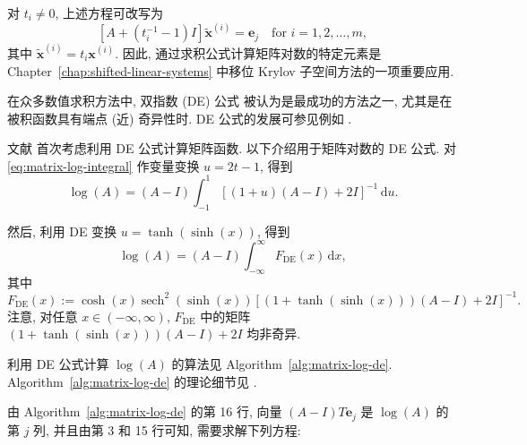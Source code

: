 {对 $t_i\ne0$, 上述方程可改写为}
\begin{equation}\label{eq:matrix-log-shifted-systems}[A+(t_i^{-1}-1)I]\widetilde{\boldsymbol{x}}^{(i)}=\boldsymbol{e}_j\quad\text{for }i=1,2,\ldots,m,\end{equation}
{其中 $\widetilde{\boldsymbol{x}}^{(i)}=t_i\boldsymbol{x}^{(i)}$. 因此, 通过求积公式计算矩阵对数的特定元素是 Chapter~\ref{chap:shifted-linear-systems} 中移位 Krylov 子空间方法的一项重要应用.}

{在众多数值求积方法中, 双指数 (DE) 公式  被认为是最成功的方法之一, 尤其是在被积函数具有端点 (近) 奇异性时. DE 公式的发展可参见例如 .}

{文献  首次考虑利用 DE 公式计算矩阵函数. 以下介绍用于矩阵对数的 DE 公式. 对 \eqref{eq:matrix-log-integral} 作变量变换 $u=2t-1$, 得到}
\begin{equation}\label{eq:matrix-log-symmetric-integral}\log(A)=(A-I)\int_{-1}^1[(1+u)(A-I)+2I]^{-1}\,\mathrm{d}u.\end{equation}

{然后, 利用 DE 变换 $u=\tanh(\sinh(x))$, 得到}
\begin{equation}\label{eq:matrix-log-de-integral}\log(A)=(A-I)\int_{-\infty}^{\infty}F_{\mathrm{DE}}(x)\,\mathrm{d}x,\end{equation}
{其中}
\begin{equation}\label{eq:matrix-log-de-integrand}F_{\mathrm{DE}}(x):=\cosh(x)\operatorname{sech}^2(\sinh(x))[(1+\tanh(\sinh(x)))(A-I)+2I]^{-1}.\end{equation}
{注意, 对任意 $x\in(-\infty,\infty)$, $F_{\mathrm{DE}}$ 中的矩阵 $(1+\tanh(\sinh(x)))(A-I)+2I$ 均非奇异.}

{利用 DE 公式计算 $\log(A)$ 的算法见 Algorithm~\ref{alg:matrix-log-de}. Algorithm~\ref{alg:matrix-log-de} 的理论细节见 .}

{由 Algorithm~\ref{alg:matrix-log-de} 的第 16 行, 向量 $(A-I)T\boldsymbol{e}_j$ 是 $\log(A)$ 的第 $j$ 列, 并且由第 3 和 15 行可知, 需要求解下列方程:}

